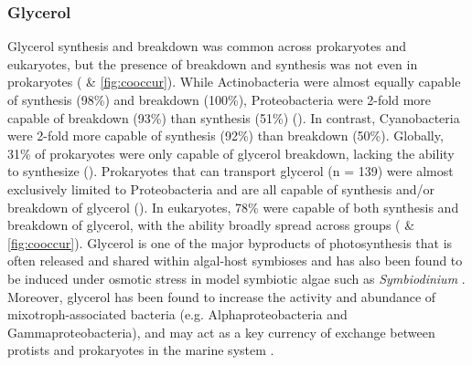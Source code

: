 \documentclass[utf8]{frontiersSCNS} %
\begin{document}
\subsubsection*{Glycerol}
Glycerol synthesis and breakdown was common across prokaryotes and eukaryotes, but the presence of breakdown and synthesis was not even in prokaryotes ( \& \ref{fig:cooccur}). While Actinobacteria were almost equally capable of synthesis (98\%) and breakdown (100\%), Proteobacteria were 2-fold more capable of breakdown (93\%) than synthesis (51\%) (). In contrast, Cyanobacteria were 2-fold more capable of synthesis (92\%) than breakdown (50\%). Globally, 31\% of prokaryotes were only capable of glycerol breakdown, lacking the ability to synthesize (). Prokaryotes that can transport glycerol (n = 139) were almost exclusively limited to Proteobacteria and are all capable of synthesis and/or breakdown of glycerol (). In eukaryotes, 78\% were capable of both synthesis and breakdown of glycerol, with the ability broadly spread across groups ( \& \ref{fig:cooccur}). Glycerol is one of the major byproducts of photosynthesis that is often released and shared within algal-host symbioses and has also been found to be induced under osmotic stress in model symbiotic algae such as \emph{Symbiodinium} \citep{Suesc_n_Bol_var_2016, Mayfield_2007}. Moreover, glycerol has been found to increase the activity and abundance of mixotroph-associated bacteria (e.g. Alphaproteobacteria and Gammaproteobacteria), and may act as a key currency of exchange between protists and prokaryotes in the marine system \citep{Poddar_2018}.  
\end{document}
